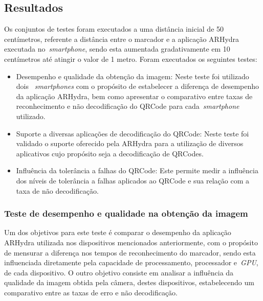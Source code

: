 \subsection{Resultados}
\label{sec:resultados}

	Os conjuntos de testes foram executados a uma distância inicial de 50
	centímetros, referente a distância entre o marcador e a aplicação ARHydra executada
	no~\textit{smartphone}, sendo esta aumentada gradativamente em 10 centímetros até atingir o valor 
	de 1 metro. Foram executados os seguintes testes:
	
	\begin{itemize}
	  \item Desempenho e qualidade da obtenção da imagem: Neste teste foi utilizado dois
	  		~\textit{smartphones} com o propósito de estabelecer a diferença de desempenho da aplicação
	  		ARHydra, bem como apresentar o comparativo entre taxas de reconhecimento e não decodificação 
	  		do QRCode para cada~\textit{smartphone} utilizado.
	  
	  \item Suporte a diversas aplicações de decodificação do QRCode: Neste teste foi validado o suporte 
	  		oferecido pela ARHydra para a utilização de diversos aplicativos cujo propósito seja a 
	  		decodificação de QRCodes.
	  		
	  \item Influência da tolerância a falhas do QRCode: Este permite medir a influência dos níveis de 
	  		tolerância a falhas aplicados ao QRCode e sua relação com a taxa de não decodificação.
	  			  
	\end{itemize}

\subsubsection{Teste de desempenho e qualidade na obtenção da imagem}
\label{sec:testesDesempenho}

 
	Um dos objetivos para este teste é comparar o desempenho da aplicação ARHydra utilizada nos dispositivos mencionados 
	anteriormente, com o propósito de  mensurar a diferença nos tempos de reconhecimento do marcador, sendo esta 
	influenciada diretamente pela capacidade de processamento, processador e~\textit{GPU}, de cada dispositivo. O outro 
	objetivo consiste em analisar a influência da qualidade da imagem obtida pela câmera, destes dispositivos, estabelecendo 
	um comparativo entre as taxas de erro e não decodificação.
	
